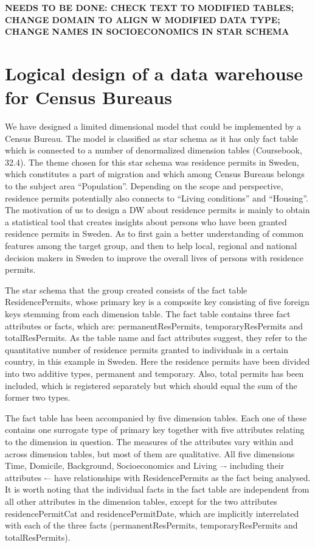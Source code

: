 
\textbf{NEEDS TO BE DONE: CHECK TEXT TO MODIFIED TABLES; CHANGE DOMAIN TO ALIGN W MODIFIED DATA TYPE; CHANGE NAMES IN SOCIOECONOMICS IN STAR SCHEMA}
\section{Logical design of a data warehouse for Census Bureaus}
We have designed a limited dimensional model that could be implemented by a Census Bureau. 
The model is classified as star schema as it has only fact table which is connected to a number 
of denormalized dimension tables (Coursebook, 32.4). The theme chosen for this star schema was 
residence permits in Sweden, which constitutes a part of migration and which among Census Bureaus 
belongs to the subject area “Population”. Depending on the scope and perspective, residence permits 
potentially also connects to “Living conditions” and “Housing”. The motivation of us to design a DW 
about residence permits is mainly to obtain a statistical tool that creates insights about persons 
who have been granted residence permits in Sweden. As to first gain a better understanding of common 
features among the target group, and then to help local, regional and national decision makers in 
Sweden to improve the overall lives of persons with residence permits. 

The star schema that the group created consists of the fact table ResidencePermits, whose primary 
key is a composite key consisting of five foreign keys stemming from each dimension table. The fact 
table contains three fact attributes or facts, which are: permanentResPermits, temporaryResPermits and 
totalResPermits. As the table name and fact attributes suggest, they refer to the quantitative number 
of residence permits granted to individuals in a certain country, in this example in Sweden. Here the 
residence permits have been divided into two additive types, permanent and temporary. Also, total 
permits has been included, which is registered separately but which should equal the sum of the former two types. 

The fact table has been accompanied by five dimension tables. Each one of these contains one surrogate 
type of primary key together with five attributes relating to the dimension in question. The measures 
of the attributes vary within and across dimension tables, but most of them are qualitative. All five 
dimensions Time, Domicile, Background, Socioeconomics and Living –- including their attributes -– have 
relationships with ResidencePermits as the fact being analysed. It is worth noting that the individual 
facts in the fact table are independent from all other attributes in the dimension tables, except for the 
two attributes residencePermitCat and residencePermitDate, which are implicitly interrelated with each of 
the three facts (permanentResPermits, temporaryResPermits and totalResPermits). 
\newpage
